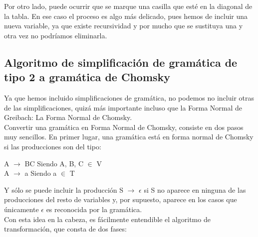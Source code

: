 \documentclass[12pt,a4paper,spanish]{book}
\begin{document}
Por otro lado, puede ocurrir que se marque una casilla que est\'e en la diagonal de la tabla. En ese caso el proceso es algo m\'as delicado, pues hemos de incluir una nueva variable, ya que existe recursividad y por mucho que se sustituya una y otra vez no podr\'iamos eliminarla.




\newpage
\subsection{Algoritmo de simplificaci\'on de gram\'atica de tipo 2 a gram\'atica de Chomsky}
Ya que hemos incluido simplificaciones de gram\'atica, no podemos no incluir otras de las simplificaciones, quiz\'a m\'as importante incluso que la Forma Normal de Greibach: La Forma Normal de Chomsky.\\
\newline
Convertir una gram\'atica en Forma Normal de Chomsky, consiste en dos pasos muy sencillos. En primer lugar, una gram\'atica est\'a en forma normal de Chomsky si las producciones son del tipo:
\begin{center}
A $\rightarrow$ BC 	Siendo A, B, C $\in$ V\\
A $\rightarrow$ a        Siendo a $\in$  T
\end{center}
Y s\'olo se puede incluir la producci\'on S $\rightarrow$ $\epsilon$ si S no aparece en ninguna de las producciones del resto de variables y, por supuesto,  aparece en los casos que \'unicamente $\epsilon$ es reconocida por la gram\'atica.\\
\newline
Con esta idea en la cabeza, es f\'acilmente entendible el algoritmo de transformaci\'on, que consta de dos fases:
\end{document}
